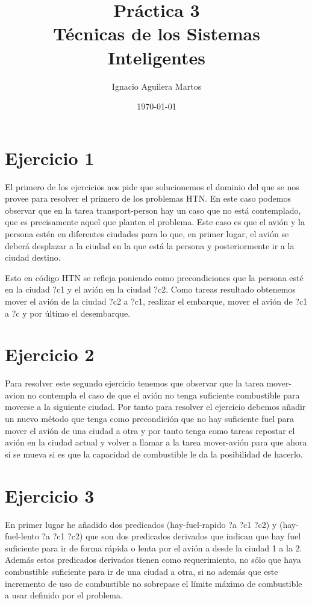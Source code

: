 \documentclass[12pt,a4paper]{article}
\author{Ignacio Aguilera Martos}
\title{Práctica 3 \\ Técnicas de los Sistemas Inteligentes}
\date{\today}
\begin{document}
	\maketitle

	\tableofcontents

	\newpage

\section{Ejercicio 1}

El primero de los ejercicios nos pide que solucionemos el dominio del que se nos provee para resolver el primero de los problemas HTN. En este caso podemos observar que en la tarea transport-person hay un caso que no está contemplado, que es precisamente aquel que plantea el problema. Este caso es que el avión y la persona estén en diferentes ciudades para lo que, en primer lugar, el avión se deberá desplazar a la ciudad en la que está la persona y posteriormente ir a la ciudad destino.

Esto en código HTN se refleja poniendo como precondiciones que la persona esté en la ciudad ?c1 y el avión en la ciudad ?c2. Como tareas resultado obtenemos mover el avión de la ciudad ?c2 a ?c1, realizar el embarque, mover el avión de ?c1 a ?c y por último el desembarque.

\section{Ejercicio 2}

Para resolver este segundo ejercicio tenemos que observar que la tarea mover-avion no contempla el caso de que el avión no tenga suficiente combustible para moverse a la siguiente ciudad. Por tanto para resolver el ejercicio debemos añadir un nuevo método que tenga como precondición que no hay suficiente fuel para mover el avión de una ciudad a otra y por tanto tenga como tareas repostar el avión en la ciudad actual y volver a llamar a la tarea mover-avión para que ahora sí se mueva si es que la capacidad de combustible le da la posibilidad de hacerlo.

\section{Ejercicio 3}

En primer lugar he añadido dos predicados (hay-fuel-rapido ?a ?c1 ?c2) y (hay-fuel-lento ?a ?c1 ?c2) que son dos predicados derivados que indican que hay fuel suficiente para ir de forma rápida o lenta por el avión a desde la ciudad 1 a la 2. Además estos predicados derivados tienen como requerimiento, no sólo que haya combustible suficiente para ir de una ciudad a otra, si no además que este incremento de uso de combustible no sobrepase el límite máximo de combustible a usar definido por el problema.
\end{document}
